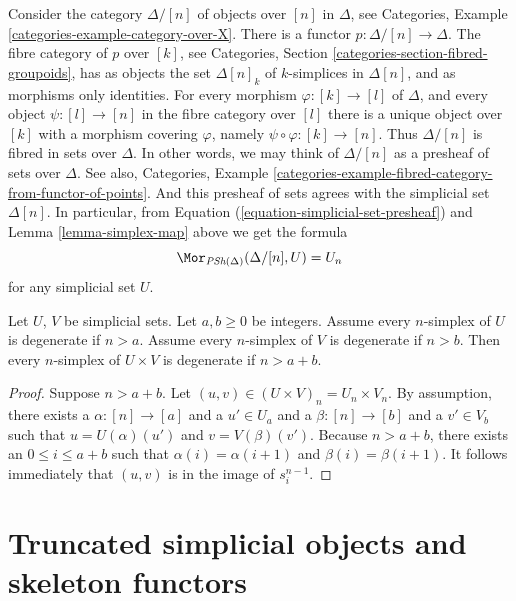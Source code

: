 \begin{example}
\label{example-simplex-category}
Consider the category $\Delta/[n]$ of objects over $[n]$
in $\Delta$, see
Categories, Example \ref{categories-example-category-over-X}.
There is a functor $p : \Delta/[n] \to \Delta$.
The fibre category of $p$ over $[k]$, see
Categories, Section \ref{categories-section-fibred-groupoids},
has as objects the
set $\Delta[n]_k$ of $k$-simplices in $\Delta[n]$, and as
morphisms only identities. For every morphism
$\varphi : [k] \to [l]$ of $\Delta$, and every object $\psi : [l] \to [n]$
in the fibre category over $[l]$ there is a unique
object over $[k]$ with a morphism covering $\varphi$, namely
$\psi \circ \varphi : [k] \to [n]$. Thus $\Delta/[n]$
is fibred in sets over $\Delta$. In other words, we may
think of $\Delta/[n]$ as a presheaf of sets over $\Delta$.
See also, Categories,
Example \ref{categories-example-fibred-category-from-functor-of-points}.
And this presheaf of sets agrees with the simplicial set
$\Delta[n]$. In particular, from Equation
(\ref{equation-simplicial-set-presheaf}) and
Lemma \ref{lemma-simplex-map} above
we get the formula
$$
\Mor_{\textit{PSh}(\Delta)}(\Delta/[n], U) = U_n
$$
for any simplicial set $U$.
\end{example}

\begin{lemma}
\label{lemma-product-degenerate}
Let $U$, $V$ be simplicial sets.
Let $a, b \geq 0$ be integers.
Assume every $n$-simplex of $U$ is degenerate if $n > a$.
Assume every $n$-simplex of $V$ is degenerate if $n > b$.
Then every $n$-simplex of $U \times V$ is degenerate
if $n > a + b$.
\end{lemma}

\begin{proof}
Suppose $n > a + b$. Let $(u, v) \in (U \times V)_n = U_n \times V_n$.
By assumption, there exists a $\alpha : [n] \to [a]$ and a
$u' \in U_a$ and a $\beta : [n] \to [b]$ and a $v' \in V_b$
such that $u = U(\alpha)(u')$ and $v = V(\beta)(v')$. Because
$n > a + b$, there exists an $0 \leq i \leq a + b$ such that
$\alpha(i) = \alpha(i + 1)$ and
$\beta(i) = \beta(i + 1)$. It follows immediately
that $(u, v)$ is in the image of $s^{n - 1}_i$.
\end{proof}



\section{Truncated simplicial objects and skeleton functors}
\label{section-skeleton}

